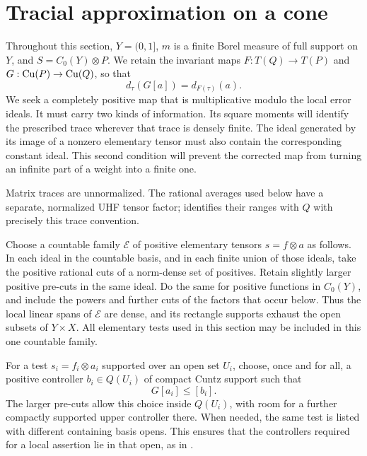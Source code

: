 \section{Tracial approximation on a cone}\label{tc:section}

Throughout this section, $Y=(0,1]$, $m$ is a finite Borel measure of full
support on $Y$, and $S=C_0(Y)\otimes P$.  We retain the invariant maps
$F:T(Q)\to T(P)$ and $G:\operatorname{Cu}(P)\to\operatorname{Cu}(Q)$, so that
\begin{equation}\label{tc:transport}
 d_\tau(G[a])=d_{F(\tau)}(a).
\end{equation}
We seek a completely positive map that is multiplicative modulo the
local error ideals.  It must carry two kinds of information.  Its square
moments will identify the prescribed trace wherever that trace is densely
finite.  The ideal generated by its image of a nonzero elementary tensor
must also contain the corresponding constant ideal.  This second condition will prevent the
corrected map from turning an infinite part of a weight into a finite one.

Matrix traces are unnormalized.  The rational averages used below have a
separate, normalized UHF tensor factor;  identifies their
ranges with $Q$ with precisely this trace convention.

Choose a countable family $\mathcal E$ of positive elementary tensors
$s=f\otimes a$ as follows.  In each ideal in the countable basis, and in
each finite union of those ideals, take the positive rational cuts of a
norm-dense set of positives.  Retain slightly larger positive pre-cuts in the
same ideal.  Do the same for positive functions in $C_0(Y)$, and include
the powers and further cuts of the factors that occur below.  Thus the
local linear spans of $\mathcal E$ are dense, and its rectangle supports
exhaust the open subsets of $Y\times X$.  All elementary tests used in
this section may be included in this one countable family.

For a test $s_i=f_i\otimes a_i$ supported over an open set $U_i$, choose,
once and for all, a positive controller $b_i\in Q(U_i)$ of compact Cuntz
support such that
\begin{equation}\label{tc:controller}
 G[a_i]\leq[b_i].
\end{equation}
The larger pre-cuts allow this choice inside $Q(U_i)$, with room for a
further compactly supported upper controller there.  When needed, the
same test is listed with different containing basis opens.  This ensures
that the controllers required for a local assertion lie in that open,
as in .


